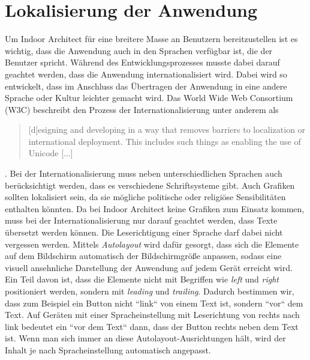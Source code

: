 \section{Lokalisierung der Anwendung}
\label{sec:localizing}
Um Indoor Architect für eine breitere Masse an Benutzern bereitzustellen ist es wichtig, dass die Anwendung auch in den Sprachen verfügbar ist, die der Benutzer spricht.
Während des Entwicklungsprozesses musste dabei darauf geachtet werden, dass die Anwendung internationalisiert wird.
Dabei wird so entwickelt, dass im Anschluss das Übertragen der Anwendung in eine andere Sprache oder Kultur leichter gemacht wird.
Das World Wide Web Consortium (W3C) beschreibt den Prozess der Internationalisierung unter anderem als \blockquote{[d]esigning and developing in a way that removes barriers to localization or international deployment. This includes such things as enabling the use of Unicode [...]} \parencite{ISH2005}.\pbreak%
%
Bei der Internationalisierung muss neben unterschiedlichen Sprachen auch berücksichtigt werden, dass es verschiedene Schriftsysteme gibt.
Auch Grafiken sollten lokalisiert sein, da sie mögliche politische oder religiöse Sensibilitäten enthalten könnten.
Da bei Indoor Architect keine Grafiken zum Einsatz kommen, muss bei der Internationalisierung nur darauf geachtet werden, dass Texte übersetzt werden können.
Die Leserichtigung einer Sprache darf dabei nicht vergessen werden.
Mittels \emph{Autolayout} wird dafür gesorgt, dass sich die Elemente auf dem Bildschirm automatisch der Bildschirmgröße anpassen, sodass eine visuell ansehnliche Darstellung der Anwendung auf jedem Gerät erreicht wird.
Ein Teil davon ist, dass die Elemente nicht mit Begriffen wie \emph{left} und \emph{right} positioniert werden, sondern mit \emph{leading} und \emph{trailing}.
Dadurch bestimmen wir, dass zum Beispiel ein Button nicht ``link`` von einem Text ist, sondern ``vor`` dem Text.
Auf Geräten mit einer Spracheinstellung mit Leserichtung von rechts nach link bedeutet ein ``vor dem Text`` dann, dass der Button rechts neben dem Text ist.
Wenn man sich immer an diese Autolayout-Ausrichtungen hält, wird der Inhalt je nach Spracheinstellung automatisch angepasst.

